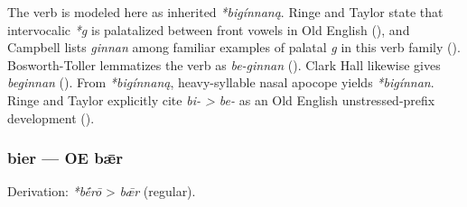 \documentclass[
  british,
  a4paper,
]{article}
\begin{document}
The verb is modeled here as inherited \emph{*bigínnaną}. Ringe and
Taylor state that intervocalic \emph{*g} is palatalized between front
vowels in Old English (), and Campbell lists \emph{ginnan} among familiar examples of
palatal \emph{g} in this verb family
(). Bosworth-Toller
lemmatizes the verb as \emph{be-ginnan}
(). Clark
Hall likewise gives \emph{beginnan} (). From \emph{*bigínnaną}, heavy-syllable nasal apocope
yields \emph{*bigínnan}. Ringe and Taylor explicitly cite \emph{bi-
\textgreater{} be-} as an Old English unstressed-prefix development
().

\subsubsection{bier --- OE bǣr}\label{bier-oe-bux1e3r}

Derivation: \emph{*bḗrō} \textgreater{} \emph{bǣr} (regular).

\begingroup
\setlength{\fboxsep}{6pt}
\end{document}
